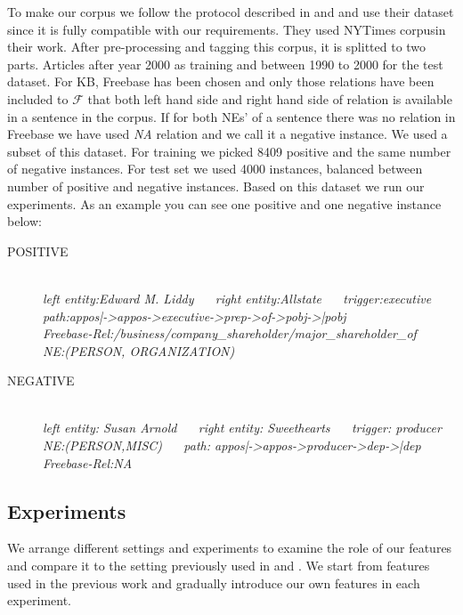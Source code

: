 To make our corpus we follow the protocol described in \cite{Riedel2013} and
\cite{Riedel2010} and use their dataset since it is fully compatible with our
requirements.
They used NYTimes corpusin their work. After pre-processing and tagging this
corpus, it is splitted to two parts. Articles after year 2000 as training and
between 1990 to 2000 for the test dataset. For KB, Freebase has been chosen and
only those relations have been included to $\mathcal{F}$ that both left hand
side and right hand side of relation is available in a sentence in the corpus.
If for both NEs' of a sentence there was no relation in Freebase we have used
\textit{NA} relation and we call it a negative instance. We used a subset of
this dataset.
For training we picked 8409 positive and the same number of negative instances.
For test set we used 4000 instances, balanced between number of positive and
negative instances. Based on this dataset we run our experiments. As an example
you can see one positive and one negative instance below:
\begin{description}
\item[POSITIVE]\hfil \\ \textit{left entity:Edward M. Liddy ~~  right
entity:Allstate ~~ trigger:executive ~~ path:appos|->appos->executive->prep->of->pobj->|pobj
~~ \\ Freebase-Rel:/business/company\_shareholder/major\_shareholder\_of
~~ NE:(PERSON, ORGANIZATION) }
\item[NEGATIVE] \hfil \\ \textit{left entity: Susan Arnold ~~ right entity:
Sweethearts ~~ trigger: producer        NE:(PERSON,MISC)
~~ path: appos|->appos->producer->dep->|dep   ~~    Freebase-Rel:NA}
\end{description}

\subsection{Experiments}
\label{ssec:textkb-exp-exp}


We arrange different settings and experiments to examine the role of our
features and compare it to the setting previously used in \cite{Bordes2011} and
\cite{Bordes2012}. We start from features used in the previous work and
gradually introduce our own features in each experiment.

